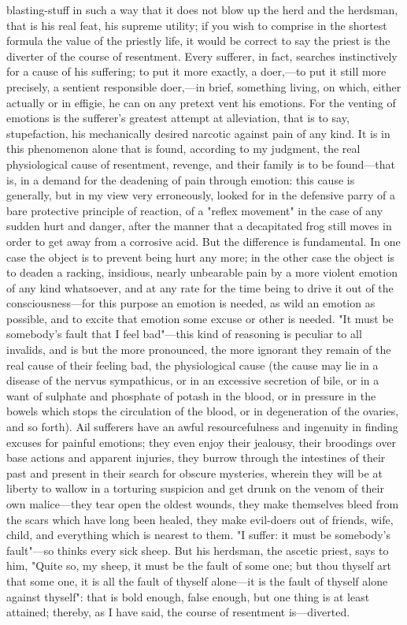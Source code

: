 \documentclass[12pt]{article}
\begin{document}
blasting-stuff in such a way that it does not blow up the herd and the herdsman, that is his real feat, his supreme utility; if you wish to comprise in the shortest formula the value of the priestly life, it would be correct to say the priest is the diverter of the course of resentment. Every sufferer, in fact, searches instinctively for a cause of his suffering; to put it more exactly, a doer,---to put it still more precisely, a sentient responsible doer,---in brief, something living, on which, either actually or in effigie, he can on any pretext vent his emotions. For the venting of emotions is the sufferer's greatest attempt at alleviation, that is to say, stupefaction, his mechanically desired narcotic against pain of any kind. It is in this phenomenon alone that is found, according to my judgment, the real physiological cause of resentment, revenge, and their family is to be found---that is, in a demand for the deadening of pain through emotion: this cause is generally, but in my view very erroneously, looked for in the defensive parry of a bare protective principle of reaction, of a "reflex movement" in the case of any sudden hurt and danger, after the manner that a decapitated frog still moves in order to get away from a corrosive acid. But the difference is fundamental. In one case the object is to prevent being hurt any more; in the other case the object is to deaden a racking, insidious, nearly unbearable pain by a more violent emotion of any kind whatsoever, and at any rate for the time being to drive it out of the consciousness---for this purpose an emotion is needed, as wild an emotion as possible, and to excite that emotion some excuse or other is needed. "It must be somebody's fault that I feel bad"---this kind of reasoning is peculiar to all invalids, and is but the more pronounced, the more ignorant they remain of the real cause of their feeling bad, the physiological cause (the cause may lie in a disease of the nervus sympathicus, or in an excessive secretion of bile, or in a want of sulphate and phosphate of potash in the blood, or in pressure in the bowels which stops the circulation of the blood, or in degeneration of the ovaries, and so forth). Ail sufferers have an awful resourcefulness and ingenuity in finding excuses for painful emotions; they even enjoy their jealousy, their broodings over base actions and apparent injuries, they burrow through the intestines of their past and present in their search for obscure mysteries, wherein they will be at liberty to wallow in a torturing suspicion and get drunk on the venom of their own malice---they tear open the oldest wounds, they make themselves bleed from the scars which have long been healed, they make evil-doers out of friends, wife, child, and everything which is nearest to them. "I suffer: it must be somebody's fault"---so thinks every sick sheep. But his herdsman, the ascetic priest, says to him, "Quite so, my sheep, it must be the fault of some one; but thou thyself art that some one, it is all the fault of thyself alone---it is the fault of thyself alone against thyself": that is bold enough, false enough, but one thing is at least attained; thereby, as I have said, the course of resentment is---diverted.
\end{document}

